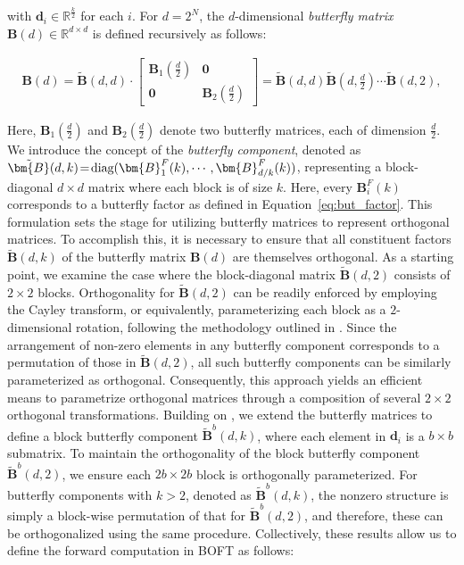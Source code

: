 with $\bm{d}_i\in\mathbb{R}^{\frac{k}{2}}$ for each $i$. For $d=2^N$, the $d$-dimensional \emph{butterfly matrix} $\bm{B}(d)\in\mathbb{R}^{d\times d}$ is defined recursively as follows:

\begin{equation}
\begin{aligned}
    \!\!\bm{B}(d)=\tilde{\bm{B}}(d,d)\!\cdot\!\begin{bmatrix}
    \bm{B}_1(\frac{d}{2})\!\!\!\!\! & \bm{0} \\
    \bm{0}\!\!\!\!\! &\bm{B}_2(\frac{d}{2})
    \end{bmatrix}= \tilde{\bm{B}}(d,d)\tilde{\bm{B}}(d,\frac{d}{2})\cdots\tilde{\bm{B}}(d,2),
\end{aligned}
\end{equation}

Here, $\bm{B}_1(\frac{d}{2})$ and $\bm{B}_2(\frac{d}{2})$ denote two butterfly matrices, each of dimension $\frac{d}{2}$. We introduce the concept of the \emph{butterfly component}, denoted as $\thickmuskip=2mu \medmuskip=2mu \tilde{\bm{B}}(d,k)=\text{diag}(\bm{B}^F_1(k),\cdots,\bm{B}^F_{d/k}(k))$, representing a block-diagonal $d\times d$ matrix where each block is of size $k$. Here, every $\bm{B}^F_i(k)$ corresponds to a butterfly factor as defined in Equation~\ref{eq:but_factor}. This formulation sets the stage for utilizing butterfly matrices to represent orthogonal matrices. To accomplish this, it is necessary to ensure that all constituent factors $\tilde{\bm{B}}(d,k)$ of the butterfly matrix $\bm{B}(d)$ are themselves orthogonal. As a starting point, we examine the case where the block-diagonal matrix $\tilde{\bm{B}}(d,2)$ consists of $2\times2$ blocks. Orthogonality for $\tilde{\bm{B}}(d,2)$ can be readily enforced by employing the Cayley transform, or equivalently, parameterizing each block as a $2$-dimensional rotation, following the methodology outlined in \cite{liu2021orthogonal,qiu2023controlling}. Since the arrangement of non-zero elements in any butterfly component corresponds to a permutation of those in $\tilde{\bm{B}}(d,2)$, all such butterfly components can be similarly parameterized as orthogonal. Consequently, this approach yields an efficient means to parametrize orthogonal matrices through a composition of several $2\times 2$ orthogonal transformations. Building on \cite{chen2022pixelated}, we extend the butterfly matrices to define a block butterfly component $\tilde{\bm{B}}^b(d,k)$, where each element in $\bm{d}_i$ is a $b\times b$ submatrix. To maintain the orthogonality of the block butterfly component $\tilde{\bm{B}}^b(d,2)$, we ensure each $2b\times 2b$ block is orthogonally parameterized. For butterfly components with $k>2$, denoted as $\tilde{\bm{B}}^b(d,k)$, the nonzero structure is simply a block-wise permutation of that for $\tilde{\bm{B}}^b(d,2)$, and therefore, these can be orthogonalized using the same procedure. Collectively, these results allow us to define the forward computation in BOFT as follows:

